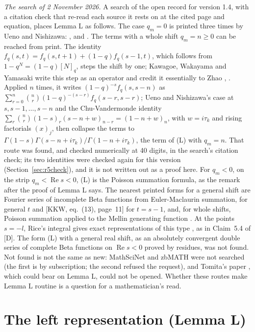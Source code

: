 \documentclass[11pt]{article}
\newcommand{\re}{\operatorname{Re}}
\begin{document}
\medskip
\noindent\emph{The search of 2 November 2026.} A search of the open record for version 1.4, with a citation check that re-read each source it rests on at the cited page and equation, places Lemma L as follows. The case $q_m=0$ is printed three times by Ueno and Nishizawa: \cite[Theorem~3, eq.~(32) with eq.~(27), arXiv pages~7 and~8]{UN}, \cite[Theorem~2, eq.~(18), printed page~24]{UN2} and \cite[Theorem~5, eq.~(10), printed page~19]{UN3}. The terms with a whole shift $q_m=n\ge0$ can be reached from print. The identity $f_q(s,t)=f_q(s,t+1)+(1-q)f_q(s-1,t)$, which follows from $1-q^N=(1-q)[N]_q$, steps the shift by one; Kawagoe, Wakayama and Yamasaki write this step as an operator and credit it essentially to Zhao \cite[eq.~(2.12), page~5]{KWY}, \cite{Zh}. Applied $n$ times, it writes $(1-q)^{-s}f_q(s,s-n)$ as $\sum_{r=0}^{n}\binom nr(1-q)^{-(s-r)}f_q(s-r,s-r)$; Ueno and Nishizawa's case at $s,s-1,\dots,s-n$ and the Chu-Vandermonde identity $\sum_r\binom nr(1-s)_r(s-n+w)_{n-r}=(1-n+w)_n$, with $w=i\tau_k$ and rising factorials $(x)_j$, then collapse the terms to $\Gamma(1-s)\Gamma(s-n+i\tau_k)/\Gamma(1-n+i\tau_k)$, the term of (L) with $q_m=n$. That route was found, and checked numerically at 40 digits, in the search's citation check; its two identities were checked again for this version (Section~\ref{sec:r5check}), and it is not written out as a proof here. For $q_m<0$, on the strip $q_m<\re s<0$, (L) is the Poisson summation formula, as the remark after the proof of Lemma L says. The nearest printed forms for a general shift are Fourier series of incomplete Beta functions from Euler-Maclaurin summation, \cite[eqs.~(2.2) and~(2.4), pages~3 and~4, and Proposition~2.3, page~5]{KWY} for general $t$ and [KKW, eq.~(13), page~11] for $t=s-1$, and, for whole shifts, Poisson summation applied to the Mellin generating function \cite[Proposition~2.4, eq.~(2.7), page~5, and Theorem~3.6, page~8]{WY}. At the points $s=-l$, Rice's integral gives exact representations of this type \cite[page~113]{FS}, as in Claim~5.4 of [D]. The form (L) with a general real shift, as an absolutely convergent double series of complete Beta functions on $\re s<0$ proved by residues, was not found. Not found is not the same as new: MathSciNet and zbMATH were not searched (the first is by subscription; the second refused the request), and Tomita's paper \cite{To}, which could bear on Lemma L, could not be opened. Whether these routes make Lemma L routine is a question for a mathematician's read.

\section{The left representation (Lemma L)}\label{sec:L}
\end{document}

